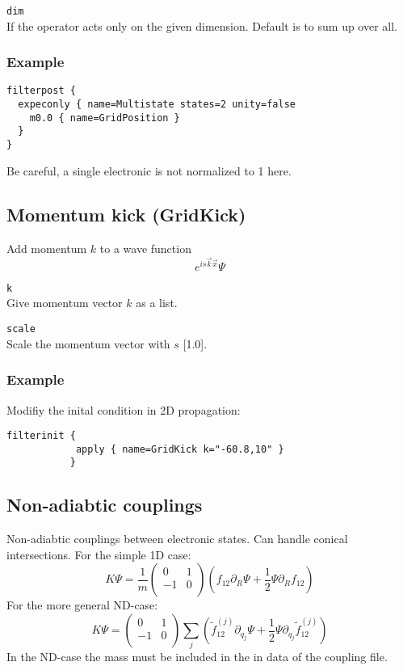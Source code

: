 \documentclass[a4paper,12pt]{scrbook}
\newcommand{\option}[2]{\item \texttt{#1}\\ #2}
\begin{document}
\begin{options}
 \option{dim}{If the operator acts only on the given dimension. Default is to sum up over all.}
\end{options}

\subsubsection*{Example}
\begin{verbatim}
filterpost {
  expeconly { name=Multistate states=2 unity=false 
    m0.0 { name=GridPosition }
  }
}
\end{verbatim}
Be careful, a single electronic is not normalized to 1 here.

\subsection{Momentum kick (GridKick)}
Add momentum $k$ to a wave function
\begin{equation}
 e^{i s \vec{k} \vec{x}} \Psi
\end{equation}
\begin{options}
 \option{k}{Give momentum vector $k$ as a list.}
 \option{scale}{Scale the momentum vector with $s$ [1.0].}
\end{options}

\subsubsection*{Example}
Modifiy the inital condition in 2D propagation:
\begin{verbatim} 
filterinit {
            apply { name=GridKick k="-60.8,10" }
           }
\end{verbatim}


\subsection{Non-adiabtic couplings}
Non-adiabtic couplings between electronic states. Can handle conical intersections.
For the simple 1D case:
\begin{equation}
 K \Psi = \frac{1}{m}
\begin{pmatrix}
 0 & 1 \\
-1 & 0 \\
\end{pmatrix}
\left (
f_{12} \partial_R \Psi + \dfrac{1}{2} \Psi \partial_R f_{12}
\right )
\end{equation}
For the more general ND-case:
\begin{equation}
 K \Psi =
\begin{pmatrix}
 0 & 1 \\
-1 & 0 \\
\end{pmatrix}
\sum_j \left (
\tilde f_{12}^{(j)} \partial_{q_j} \Psi + \dfrac{1}{2} \Psi \partial_{q_j} \tilde f_{12}^{(j)}
\right )
\end{equation}
In the ND-case the mass must be included in the in data of the coupling file.
\end{document}
